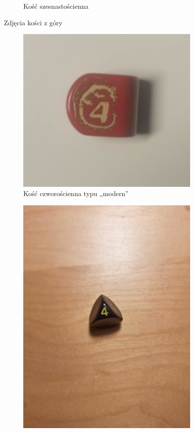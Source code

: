\begin{figure}[h]
\begin{subfigure}{.3\textwidth}
        \caption{\label{fig:k16}Kość szesnastościenna}
      \end{subfigure}
    \caption{Zdjęcia kości z góry}
\end{figure}

\begin{figure}[h]
    \centering
      \begin{subfigure}{.45\textwidth}
        \includegraphics[width=.9\linewidth]{chapters/02-teoria/figures/modern_k4}
        \caption{\label{fig:modern_k4}Kość czworościenna typu „modern”}
      \end{subfigure}%
      \begin{subfigure}{.45\textwidth}
        \includegraphics[width=.9\linewidth, trim={250mm 200mm 350mm 150mm}, clip]{chapters/02-teoria/figures/nietypowe_k4}

\end{subfigure}
\end{figure}
